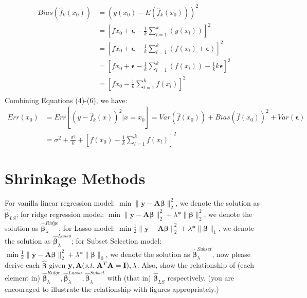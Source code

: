 \documentclass[11pt]{article}
\newcommand{\mtx}[1]{\mathbf{#1}}
\newcommand{\vct}[1]{\mathbf{#1}}
\def \mA {\mtx{A}}
\def \mI {\mtx{I}}
\def \vy {\vct{y}}
\def \mepsilon {\mtx{\epsilon}}
\begin{document}
\begin{equation}
\begin{aligned}
Bias(\hat{f}_k(x_0)) &= (y(x_0)-E(\hat{f}_k(x_0)))^2\\
&= [f{x_0}+\mepsilon-\frac{1}{k}\sum_{l=1}^{k}(y(x_l))]^2\\
&= [f{x_0}+\mepsilon-\frac{1}{k}\sum_{l=1}^{k}(f(x_l)+\mepsilon)]^2\\
&= [f{x_0}+\mepsilon-\frac{1}{k}\sum_{l=1}^{k}(f(x_l))-\frac{1}{k}k\mepsilon]^2\\
&= [f{x_0}-\frac{1}{k}\sum_{l=1}^kf(x_l)]^2\\
\end{aligned}
\end{equation}
Combining Equations (4)-(6), we have: 
\begin{equation}
\begin{aligned}
Err(x_0) &= Err[(y-\hat{f}_k(x))^2 | x=x_0]=Var(\hat{f}(x_0))+Bias(\hat{f}(x_0))^2+Var(\mepsilon)\\
&=\sigma^2+\frac{\sigma^2}{k}+[f(x_0)-\frac{1}{k}\sum_{l=1}^{k}f(x_l)]^2
\end{aligned}
\end{equation}


\section*{Shrinkage Methods}
For vanilla linear regression model: $\min \|\vy-\mA\bm{\beta}\|_2^2$, 
we denote the solution as $\hat{\bm{\beta}}_{LS}$; for ridge regression model: $\min \|\vy-\mA\bm{\beta}\|_2^2+\lambda*\|\bm{\beta}\|_2^2$, we denote the solution as $\hat{\bm{\beta}}_\lambda^{Ridge}$; for Lasso model: $\min \frac{1}{2}\|\vy-\mA\bm{\beta}\|_2^2+\lambda*\|\bm{\beta}\|_1$, we denote the solution as $\hat{\bm{\beta}}_\lambda^{Lasso}$; for Subset Selection model:  $\min \frac{1}{2}\|\vy-\mA\bm{\beta}\|_2^2+\lambda*\|\bm{\beta}\|_0$, we denote the solution as $\hat{\bm{\beta}}_\lambda^{Subset}$, now please derive each $\hat{\bm{\beta}}$ given $\vy, \mA  (\st \ \mA^T\mA=\mI), \lambda$. Also, show the relationship of (each element in) $\hat{\bm{\beta}}_\lambda^{Ridge}, \hat{\bm{\beta}}_\lambda^{Lasso}, \hat{\bm{\beta}}_\lambda^{Subset}$ with (that in) $\hat{\bm{\beta}}_{LS}$ respectively. (you are encouraged to illustrate the relationship with figures appropriately.)
\vspace{4cm}
\end{document}
